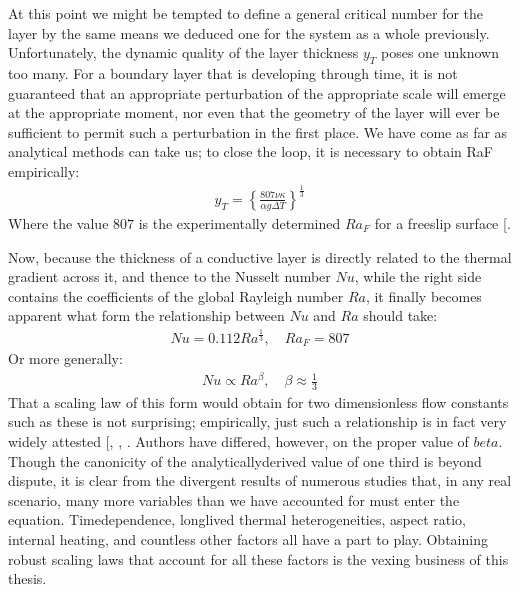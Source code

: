 \documentclass[letterpaper,10pt,english]{jupyterBook}
\begin{document}
\sphinxAtStartPar
At this point we might be tempted to define a general critical  number for the layer by the same means we deduced one for the system as a whole previously. Unfortunately, the dynamic quality of the layer thickness \(y_T\) poses one unknown too many. For a boundary layer that is developing through time, it is not guaranteed that an appropriate perturbation of the appropriate scale will emerge at the appropriate moment, nor even that the geometry of the layer will ever be sufficient to permit such a perturbation in the first place. We have come as far as analytical methods can take us; to close the loop, it is necessary to obtain RaF empirically:
\begin{equation*}
\begin{split} y_T = \left\{ \frac{807 \nu \kappa}{\alpha g \Delta T} \right\} ^{\frac{1}{3}} \end{split}
\end{equation*}
\sphinxAtStartPar
Where the value \(807\) is the experimentally determined \(Ra_F\) for a free\sphinxhyphen{}slip surface {[}\sphinxcite{references:id78}{]}.

\sphinxAtStartPar
Now, because the thickness of a conductive layer is directly related to the thermal gradient across it, and thence to the Nusselt number \(Nu\), while the right side contains the coefficients of the global Rayleigh number \(Ra\), it finally becomes apparent what form the relationship between \(Nu\) and \(Ra\) should take:
\begin{equation*}
\begin{split} Nu = 0.112 Ra^{\frac{1}{3}}, \quad Ra_F = 807 \end{split}
\end{equation*}
\sphinxAtStartPar
Or more generally:
\begin{equation*}
\begin{split} Nu \propto Ra^\beta, \quad \beta \approx \frac{1}{3} \end{split}
\end{equation*}
\sphinxAtStartPar
That a scaling law of this form would obtain for two dimensionless flow constants such as these is not surprising; empirically, just such a relationship is in fact very widely attested {[}, , \sphinxcite{references:id79}{]}. Authors have differed, however, on the proper value of \(beta\). Though the canonicity of the analytically\sphinxhyphen{}derived value of one third is beyond dispute, it is clear from the divergent results of numerous studies that, in any real scenario, many more variables than we have accounted for must enter the equation. Time\sphinxhyphen{}dependence, long\sphinxhyphen{}lived thermal heterogeneities, aspect ratio, internal heating, and countless other factors all have a part to play. Obtaining robust scaling laws that account for all these factors is the vexing business of this thesis.
\end{document}
